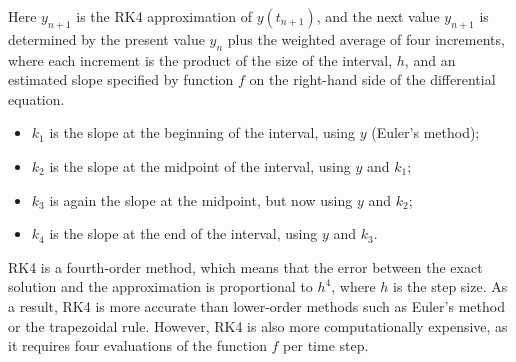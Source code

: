 \documentclass  [
  paper    = a4,
  BCOR     = 10mm,
  twoside,
  fontsize = 12pt,
  fleqn,
  toc      = bibnumbered,
  toc      = listofnumbered,
  numbers  = noendperiod,
  headings = normal,
  listof   = leveldown,
  version  = 3.03
]                                       {scrreprt}
\newcommand{\<}{\langle}
\renewcommand{\>}{\rangle}
\begin{document}
  	Here $y_{n+1}$ is the RK4 approximation of $y(t_{n+1})$, and the next value $y_{n+1}$ is determined by the present value $y_n$ plus the weighted average of four increments, where each increment is the product of the size of the interval, $h$, and an estimated slope specified by function $f$ on the right-hand side of the differential equation.
  	\begin{itemize}
  		\item  $k_1$ is the slope at the beginning of the interval, using $y$  (Euler's method);
  		\item  $k_2$ is the slope at the midpoint of the interval, using $y$ and $k_1$;
  		\item  $k_3$ is again the slope at the midpoint, but now using $y$ and $k_2$;
  		\item $k_4$ is the slope at the end of the interval, using $y$ and $k_3$.
  	\end{itemize}
  
 RK4 is a fourth-order method, which means that the error between the exact solution and the approximation is proportional to $h^4$, where $h$ is the step size. As a result, RK4 is more accurate than lower-order methods such as Euler's method or the trapezoidal rule. However, RK4 is also more computationally expensive, as it requires four evaluations of the function $f$ per time step. 
  	
  	
    \newpage
    {}
     \newpage
    
    
 \newpage
\end{document}
